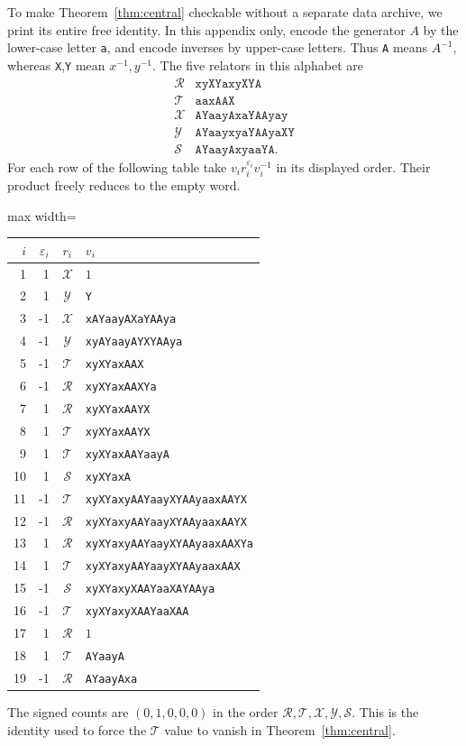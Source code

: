 \documentclass[11pt]{amsart}
\theoremstyle{definition}
\theoremstyle{remark}
\begin{document}
To make Theorem~\ref{thm:central} checkable without a separate data
archive, we print its entire free identity. In this appendix only,
encode the generator $A$ by the lower-case letter \texttt{a}, and
encode inverses by upper-case letters. Thus \texttt{A} means $A^{-1}$,
whereas \texttt{X},\texttt{Y} mean $x^{-1},y^{-1}$.
The five relators in this alphabet are
\[
\begin{array}{c|l}
\mathcal R&\texttt{xyXYaxyXYA}\\
\mathcal T&\texttt{aaxAAX}\\
\mathcal X&\texttt{AYaayAxaYAAyay}\\
\mathcal Y&\texttt{AYaayxyaYAAyaXY}\\
\mathcal S&\texttt{AYaayAxyaaYA}.
\end{array}
\]
For each row of the following table take $v_i r_i^{\varepsilon_i}v_i^{-1}$
in its displayed order. Their product freely reduces to the empty word.
\begin{center}
\begin{adjustbox}{max width=\textwidth}
\begin{tabular}{rrcl}
\toprule
$i$&$\varepsilon_i$&$r_i$&$v_i$\\\midrule
1&1&$\mathcal X$&$1$\\
2&1&$\mathcal Y$&\texttt{Y}\\
3&-1&$\mathcal X$&\texttt{xAYaayAXaYAAya}\\
4&-1&$\mathcal Y$&\texttt{xyAYaayAYXYAAya}\\
5&-1&$\mathcal T$&\texttt{xyXYaxAAX}\\
6&-1&$\mathcal R$&\texttt{xyXYaxAAXYa}\\
7&1&$\mathcal R$&\texttt{xyXYaxAAYX}\\
8&1&$\mathcal T$&\texttt{xyXYaxAAYX}\\
9&1&$\mathcal T$&\texttt{xyXYaxAAYaayA}\\
10&1&$\mathcal S$&\texttt{xyXYaxA}\\
11&-1&$\mathcal T$&\texttt{xyXYaxyAAYaayXYAAyaaxAAYX}\\
12&-1&$\mathcal R$&\texttt{xyXYaxyAAYaayXYAAyaaxAAYX}\\
13&1&$\mathcal R$&\texttt{xyXYaxyAAYaayXYAAyaaxAAXYa}\\
14&1&$\mathcal T$&\texttt{xyXYaxyAAYaayXYAAyaaxAAX}\\
15&-1&$\mathcal S$&\texttt{xyXYaxyXAAYaaXAYAAya}\\
16&-1&$\mathcal T$&\texttt{xyXYaxyXAAYaaXAA}\\
17&1&$\mathcal R$&$1$\\
18&1&$\mathcal T$&\texttt{AYaayA}\\
19&-1&$\mathcal R$&\texttt{AYaayAxa}\\\bottomrule
\end{tabular}
\end{adjustbox}
\end{center}
The signed counts are $(0,1,0,0,0)$ in the order
$\mathcal R,\mathcal T,\mathcal X,\mathcal Y,\mathcal S$.
This is the identity used to force the $\mathcal T$ value to vanish
in Theorem~\ref{thm:central}.
\end{document}
